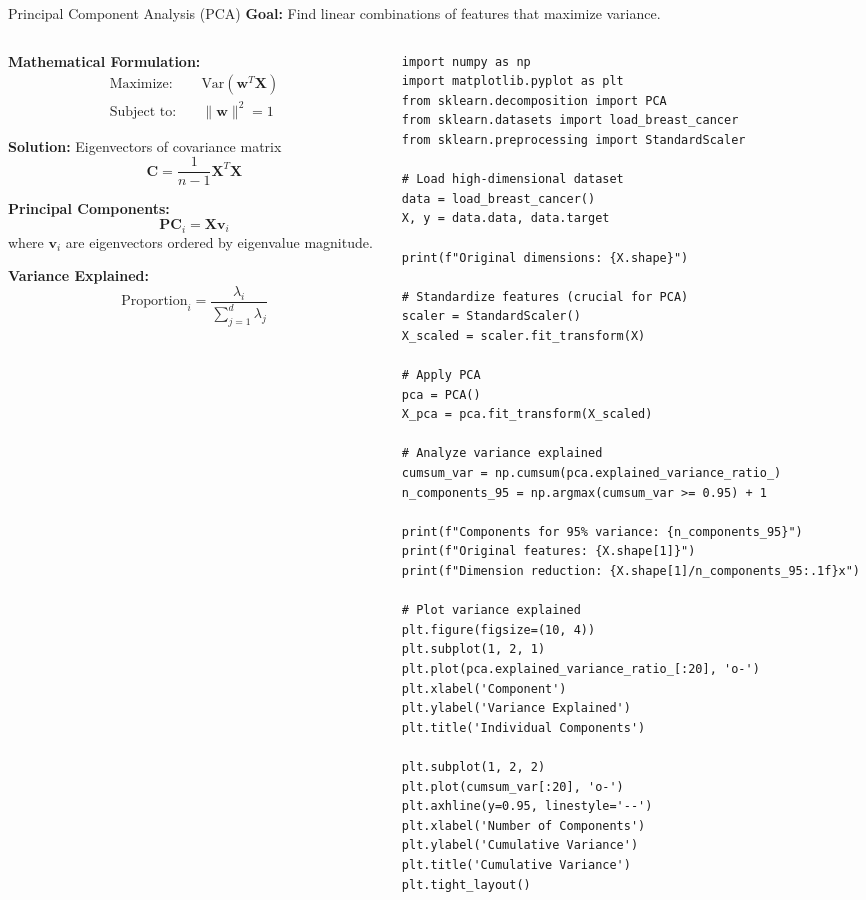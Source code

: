 \documentclass[aspectratio=169,11pt]{beamer}
\begin{document}
\begin{frame}[fragile]{Principal Component Analysis (PCA)}
\textbf{Goal:} Find linear combinations of features that maximize variance.

\begin{columns}
\begin{column}{0.5\textwidth}
\textbf{Mathematical Formulation:}
\begin{align}
\text{Maximize:} \quad &\text{Var}(\mathbf{w}^T \mathbf{X})\\
\text{Subject to:} \quad &\|\mathbf{w}\|^2 = 1
\end{align}

\textbf{Solution:} Eigenvectors of covariance matrix
\[\mathbf{C} = \frac{1}{n-1}\mathbf{X}^T\mathbf{X}\]

\textbf{Principal Components:}
\[\mathbf{PC}_i = \mathbf{X} \mathbf{v}_i\]
where $\mathbf{v}_i$ are eigenvectors ordered by eigenvalue magnitude.

\vspace{0.3cm}
\textbf{Variance Explained:}
\[\text{Proportion}_i = \frac{\lambda_i}{\sum_{j=1}^d \lambda_j}\]
\end{column}
\begin{column}{0.5\textwidth}
\begin{lstlisting}
import numpy as np
import matplotlib.pyplot as plt
from sklearn.decomposition import PCA
from sklearn.datasets import load_breast_cancer
from sklearn.preprocessing import StandardScaler

# Load high-dimensional dataset
data = load_breast_cancer()
X, y = data.data, data.target

print(f"Original dimensions: {X.shape}")

# Standardize features (crucial for PCA)
scaler = StandardScaler()
X_scaled = scaler.fit_transform(X)

# Apply PCA
pca = PCA()
X_pca = pca.fit_transform(X_scaled)

# Analyze variance explained
cumsum_var = np.cumsum(pca.explained_variance_ratio_)
n_components_95 = np.argmax(cumsum_var >= 0.95) + 1

print(f"Components for 95% variance: {n_components_95}")
print(f"Original features: {X.shape[1]}")
print(f"Dimension reduction: {X.shape[1]/n_components_95:.1f}x")

# Plot variance explained
plt.figure(figsize=(10, 4))
plt.subplot(1, 2, 1)
plt.plot(pca.explained_variance_ratio_[:20], 'o-')
plt.xlabel('Component')
plt.ylabel('Variance Explained')
plt.title('Individual Components')

plt.subplot(1, 2, 2)
plt.plot(cumsum_var[:20], 'o-')
plt.axhline(y=0.95, linestyle='--')
plt.xlabel('Number of Components')
plt.ylabel('Cumulative Variance')
plt.title('Cumulative Variance')
plt.tight_layout()
\end{lstlisting}
\end{column}
\end{columns}
\end{frame}
\end{document}
